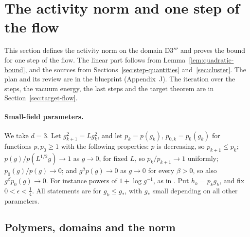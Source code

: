 \section{The activity norm and one step of the flow}\label{sec:flow}

This section defines the activity norm on the domain D3$'''$ and proves the bound for one step of the flow. The linear part follows from Lemma~\ref{lem:quadratic-bound}, and the sources from Sections~\ref{sec:step-quantities} and~\ref{sec:cluster}. The plan and its review are in the blueprint (Appendix~J). The iteration over the steps, the vacuum energy, the last steps and the target theorem are in Section~\ref{sec:target-flow}.

\paragraph{Small-field parameters.} We take $d=3$. Let $g_{k+1}^2=Lg_k^2$, and let $p_k=p(g_k)$, $p_{0,k}=p_0(g_k)$ for functions $p,p_0\ge1$ with the following properties: $p$ is decreasing, so $p_{k+1}\le p_k$; $p(g)/p(L^{1/2}g)\to1$ as $g\to0$, for fixed $L$, so $p_k/p_{k+1}\to1$ uniformly; $p_0(g)/p(g)\to0$; and $g^\beta p(g)\to0$ as $g\to0$ for every $\beta>0$, so also $g^\beta p_0(g)\to0$. For instance powers of $1+\log g^{-1}$, as in \cite{DimockI}. Put $h_k=p_kg_k$, and fix $0<\epsilon<\frac14$. All statements are for $g_k\le g_*$, with $g_*$ small depending on all other parameters.

\subsection{Polymers, domains and the norm}\label{subsec:flow-norm}

